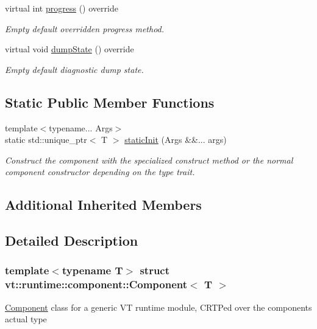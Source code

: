 \begin{DoxyCompactItemize}
virtual int \hyperlink{structvt_1_1runtime_1_1component_1_1_component_a1dab11d9eb5bed8dfd5a3bb8fdf67f5a}{progress} () override
\begin{DoxyCompactList}\small\item\em Empty default overridden progress method. \end{DoxyCompactList}\item 
virtual void \hyperlink{structvt_1_1runtime_1_1component_1_1_component_adaf8bd995d4c91702e2ff7806ad9e695}{dump\+State} () override
\begin{DoxyCompactList}\small\item\em Empty default diagnostic dump state. \end{DoxyCompactList}\end{DoxyCompactItemize}
\subsection*{Static Public Member Functions}
\begin{DoxyCompactItemize}
\item 
{\footnotesize template$<$typename... Args$>$ }\\static std\+::unique\+\_\+ptr$<$ T $>$ \hyperlink{structvt_1_1runtime_1_1component_1_1_component_ac969a635e579cf7be3af696f500bf260}{static\+Init} (Args \&\&... args)
\begin{DoxyCompactList}\small\item\em Construct the component with the specialized construct method or the normal component constructor depending on the type trait. \end{DoxyCompactList}\end{DoxyCompactItemize}
\subsection*{Additional Inherited Members}


\subsection{Detailed Description}
\subsubsection*{template$<$typename T$>$\newline
struct vt\+::runtime\+::component\+::\+Component$<$ T $>$}

{\ttfamily \hyperlink{structvt_1_1runtime_1_1component_1_1_component}{Component}} class for a generic VT runtime module, C\+R\+TP\textquotesingle{}ed over the component\textquotesingle{}s actual type 

